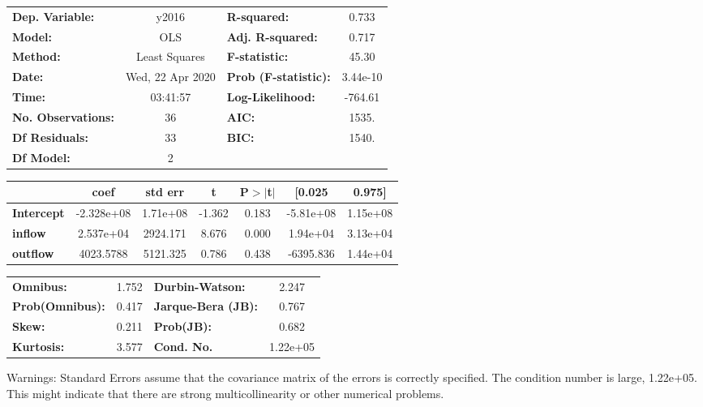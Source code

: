 \begin{center}
\begin{tabular}{lclc}
\toprule
\textbf{Dep. Variable:}    &      y2016       & \textbf{  R-squared:         } &     0.733   \\
\textbf{Model:}            &       OLS        & \textbf{  Adj. R-squared:    } &     0.717   \\
\textbf{Method:}           &  Least Squares   & \textbf{  F-statistic:       } &     45.30   \\
\textbf{Date:}             & Wed, 22 Apr 2020 & \textbf{  Prob (F-statistic):} &  3.44e-10   \\
\textbf{Time:}             &     03:41:57     & \textbf{  Log-Likelihood:    } &   -764.61   \\
\textbf{No. Observations:} &          36      & \textbf{  AIC:               } &     1535.   \\
\textbf{Df Residuals:}     &          33      & \textbf{  BIC:               } &     1540.   \\
\textbf{Df Model:}         &           2      & \textbf{                     } &             \\
\bottomrule
\end{tabular}
\begin{tabular}{lcccccc}
                   & \textbf{coef} & \textbf{std err} & \textbf{t} & \textbf{P$> |$t$|$} & \textbf{[0.025} & \textbf{0.975]}  \\
\midrule
\textbf{Intercept} &   -2.328e+08  &     1.71e+08     &    -1.362  &         0.183        &    -5.81e+08    &     1.15e+08     \\
\textbf{inflow}    &    2.537e+04  &     2924.171     &     8.676  &         0.000        &     1.94e+04    &     3.13e+04     \\
\textbf{outflow}   &    4023.5788  &     5121.325     &     0.786  &         0.438        &    -6395.836    &     1.44e+04     \\
\bottomrule
\end{tabular}
\begin{tabular}{lclc}
\textbf{Omnibus:}       &  1.752 & \textbf{  Durbin-Watson:     } &    2.247  \\
\textbf{Prob(Omnibus):} &  0.417 & \textbf{  Jarque-Bera (JB):  } &    0.767  \\
\textbf{Skew:}          &  0.211 & \textbf{  Prob(JB):          } &    0.682  \\
\textbf{Kurtosis:}      &  3.577 & \textbf{  Cond. No.          } & 1.22e+05  \\
\bottomrule
\end{tabular}
\end{center}

Warnings: \newline
 [1] Standard Errors assume that the covariance matrix of the errors is correctly specified. \newline
 [2] The condition number is large, 1.22e+05. This might indicate that there are \newline
 strong multicollinearity or other numerical problems.